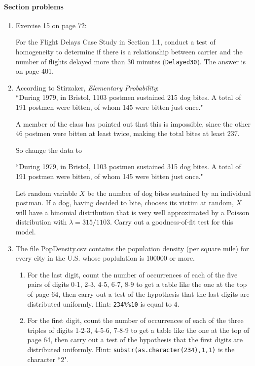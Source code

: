 \documentclass[12pt]{article}
\begin{document}
\pagebreak


\paragraph*{Section problems}

\begin{enumerate}

\item Exercise 15 on page 72:

For the Flight Delays Case Study in Section 1.1, conduct a test of homogeneity to determine if there is a relationship between carrier and the number of flights delayed more than 30 minutes (\verb!Delayed30!). The answer is on page 401.

\item According to Stirzaker, \emph{Elementary Probability}:\\
``During 1979, in Bristol, 1103 postmen sustained 215 dog bites. A total of 191 postmen were bitten, of whom 145 were bitten just once."

A member of the class has pointed out that this is impossible, since the other 46 postmen were bitten at least twice, making the total bites at least 237.


So change the data to

``During 1979, in Bristol, 1103 postmen sustained 315 dog bites. A total of 191 postmen were bitten, of whom 145 were bitten just once."



Let random variable $X$ be the number of dog bites sustained by an individual postman. If a dog, having decided to bite, chooses its victim at random, $X$ will have a binomial distribution that is very well approximated by a Poisson distribution with $\lambda = 315/1103$. Carry out a goodness-of-fit test for this model.

\item The file PopDensity.csv contains the population density (per square mile) for every city in the U.S. whose poplulation is 100000 or more.

\begin{enumerate}
\item For the last digit, count the number of occurrences  of each of the five pairs of digits 0-1, 2-3, 4-5, 6-7, 8-9 to get a table like the one at the top of page 64, then carry out a test of the hypothesis that the last digits are distributed uniformly. Hint: \verb!234%%10! is equal to 4.

\item For the first digit, count the number of occurrences of each of the three triples of digits 1-2-3, 4-5-6, 7-8-9 to get a table like the one at the top of page 64, then carry out a test of the hypothesis that the first digits are distributed uniformly. Hint: \verb!substr(as.character(234),1,1)! is the character ``2".

\end{enumerate}

\end{enumerate}
\end{document}
